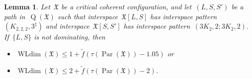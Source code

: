 \documentclass[english,a4paper]{article}
\theoremstyle{plain}
\newtheorem{lemma}      [theorem]{Lemma}
\theoremstyle{definition}
\newcommand{\coherentConfig}{\ensuremath{\mathfrak{X}}}
\newcommand{\interspace}[2]{\ensuremath{\coherentConfig[#1,#2]}}
\DeclareMathOperator*{\WLdim}{WLdim}
\newcommand{\wldim}[1]{\ensuremath{\WLdim\left(#1\right)}}
\DeclareMathOperator*{\Quotient}{Q}
\newcommand{\quotientGraph}[1]{\ensuremath{\Quotient(#1)}}
\newcommand{\f}{f}
\DeclareMathOperator{\parameters}{Par}
\newcommand{\ipsixMatchingMatching}     {\ensuremath{(\disjointCliques{3}{2},2;\disjointCliques{3}{2},2)}}
\newcommand{\ipsixMatchingComplementD}{\ensuremath{(\clique{2,2,2},3^\ddag)}}
\newcommand{\clique}[1]{\ensuremath{K_{#1}}}
\newcommand{\disjointCliques}[2]{\ensuremath{#1 \clique{#2}}}
\begin{document}
\begin{lemma}
\label{local:alternating-6cycle/lem}
    Let~$\coherentConfig$ be a critical coherent configuration, and let~$(L,S,S')$ be a path in~$\quotientGraph{\coherentConfig}$ such that interspace~$\interspace{L}{S}$ has interspace pattern~$\ipsixMatchingComplementD$ and interspace~$\interspace{S}{S'}$ has interspace pattern~$\ipsixMatchingMatching$.
    If~$\{L,S\}$ is not dominating, then
    \begin{itemize}
        \item $\wldim{\coherentConfig} \leq 1 + \widetilde{\f}( \tau(\parameters(\coherentConfig)) - 1.05)$ or
        \item $\wldim{\coherentConfig} \leq 2 + \widetilde{\f}( \tau(\parameters(\coherentConfig)) - 2)$.
    \end{itemize}
\end{lemma}
\end{document}
